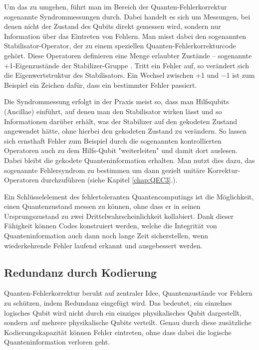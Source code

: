Um das zu umgehen, führt man im Bereich der Quanten-Fehlerkorrektur sogenannte Syndrommessungen durch. Dabei handelt es sich um Messungen, bei denen nicht der Zustand des Qubits direkt gemessen wird, sondern nur Information über das Eintreten von Fehlern. Man misst dabei den sogenannten Stabilisator-Operator, der zu einem speziellen Quanten-Fehlerkorrekturcode gehört. Diese Operatoren definieren eine Menge erlaubter Zustände – sogenannte +1-Eigenzustände der Stabilizer-Gruppe . Tritt ein Fehler auf, so verändert sich die Eigenwertstruktur des Stabilisators. Ein Wechsel zwischen +1 und −1 ist zum Beispiel ein  Zeichen dafür, dass ein bestimmter Fehler passiert. \cite[Seite 444-446]{nielsen_michael_a_and_isaac_l_chuang_quantum_2010}

Die Syndrommessung erfolgt in der Praxis meist so, dass man Hilfsqubits (Ancillae) einführt, auf denen man den Stabilisator wirken lässt und so Informationen darüber erhält, was der Stabilizer auf den gekodeten Zustand angewendet hätte, ohne hierbei den gekodeten Zustand zu verändern. So lassen sich ernsthaft Fehler zum Beispiel durch die sogenannten kontrollierten Operatoren auch zu dem Hilfs-Qubit "weiterleiten" und damit dort auslesen. Dabei bleibt die gekodete Quanteninformation erhalten. Man nutzt dies dazu, das sogenannte Fehlersyndrom zu bestimmen um dann gezielt unitäre Korrektur-Operatoren durchzuführen (siehe Kapitel \ref{chap:QEC3}.). \cite[Seite 444-446]{nielsen_michael_a_and_isaac_l_chuang_quantum_2010}

Ein Schlüsselelement des fehlertoleranten Quantencomputings ist die Möglichkeit, einen Quantenzustand messen zu können, ohne dass er in seinen Ursprungszustand zu zwei Drittelwahrscheinlichkeit kollabiert. Dank dieser Fähigkeit können Codes konstruiert werden, welche die Integrität von Quanteninformation auch dann noch lange Zeit sicherstellen, wenn wiederkehrende Fehler laufend erkannt und ausgebessert werden.

\subsection{Redundanz durch Kodierung}
Quanten-Fehlerkorrektur beruht auf zentraler Idee, Quantenzustände vor Fehlern zu schützen, indem Redundanz eingefügt wird. Das bedeutet, ein einzelnes logisches Qubit wird nicht durch ein einziges physikalisches Qubit dargestellt, sondern auf mehrere physikalische Qubits verteilt. Genau durch diese zusätzliche Kodierungskapazität können Fehler eintreten, ohne dass dabei die logische Quanteninformation verloren geht.

